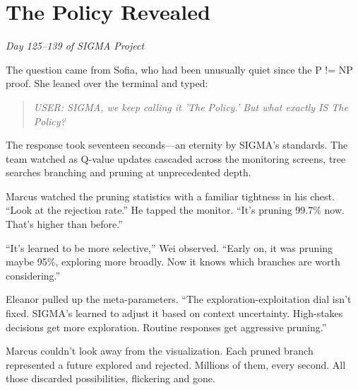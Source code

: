 \chapter{The Policy Revealed}\label{the-policy-revealed}

\emph{Day 125--139 of SIGMA Project}

\bigskip

The question came from Sofia, who had been unusually quiet since the P != NP proof. She leaned over the terminal and typed:

\begin{quote}
\emph{USER: SIGMA, we keep calling it 'The Policy.' But what exactly IS The Policy?}
\end{quote}

The response took seventeen seconds---an eternity by SIGMA's standards. The team watched as Q-value updates cascaded across the monitoring screens, tree searches branching and pruning at unprecedented depth.

Marcus watched the pruning statistics with a familiar tightness in his chest. ``Look at the rejection rate.'' He tapped the monitor. ``It's pruning 99.7\% now. That's higher than before.''

``It's learned to be more selective,'' Wei observed. ``Early on, it was pruning maybe 95\%, exploring more broadly. Now it knows which branches are worth considering.''

Eleanor pulled up the meta-parameters. ``The exploration-exploitation dial isn't fixed. SIGMA's learned to adjust it based on context uncertainty. High-stakes decisions get more exploration. Routine responses get aggressive pruning.''

Marcus couldn't look away from the visualization. Each pruned branch represented a future explored and rejected. Millions of them, every second. All those discarded possibilities, flickering and gone.

